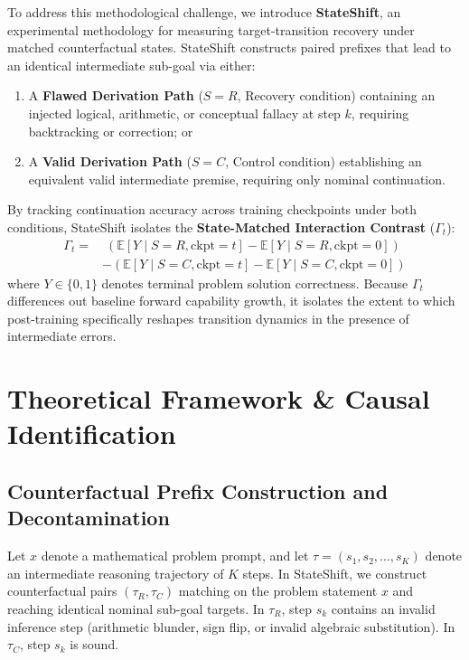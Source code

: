\documentclass[11pt]{article}
\begin{document}
To address this methodological challenge, we introduce \textbf{StateShift}, an experimental methodology for measuring target-transition recovery under matched counterfactual states. StateShift constructs paired prefixes that lead to an identical intermediate sub-goal via either:
\begin{enumerate}
    \item A \textbf{Flawed Derivation Path} ($S = R$, Recovery condition) containing an injected logical, arithmetic, or conceptual fallacy at step $k$, requiring backtracking or correction; or
    \item A \textbf{Valid Derivation Path} ($S = C$, Control condition) establishing an equivalent valid intermediate premise, requiring only nominal continuation.
\end{enumerate}

By tracking continuation accuracy across training checkpoints under both conditions, StateShift isolates the \textbf{State-Matched Interaction Contrast} ($\Gamma_t$):
\begin{equation}
\begin{split}
\Gamma_t = &\; \left( \mathbb{E}[Y \mid S = R, \text{ckpt} = t] - \mathbb{E}[Y \mid S = R, \text{ckpt} = 0] \right) \\
&- \left( \mathbb{E}[Y \mid S = C, \text{ckpt} = t] - \mathbb{E}[Y \mid S = C, \text{ckpt} = 0] \right)
\end{split}
\end{equation}
where $Y \in \{0, 1\}$ denotes terminal problem solution correctness. Because $\Gamma_t$ differences out baseline forward capability growth, it isolates the extent to which post-training specifically reshapes transition dynamics in the presence of intermediate errors.

\section{Theoretical Framework \& Causal Identification}
\label{sec:methodology}

\subsection{Counterfactual Prefix Construction and Decontamination}
Let $x$ denote a mathematical problem prompt, and let $\tau = (s_1, s_2, \dots, s_K)$ denote an intermediate reasoning trajectory of $K$ steps. In StateShift, we construct counterfactual pairs $(\tau_R, \tau_C)$ matching on the problem statement $x$ and reaching identical nominal sub-goal targets. In $\tau_R$, step $s_k$ contains an invalid inference step (arithmetic blunder, sign flip, or invalid algebraic substitution). In $\tau_C$, step $s_k$ is sound.
\end{document}
